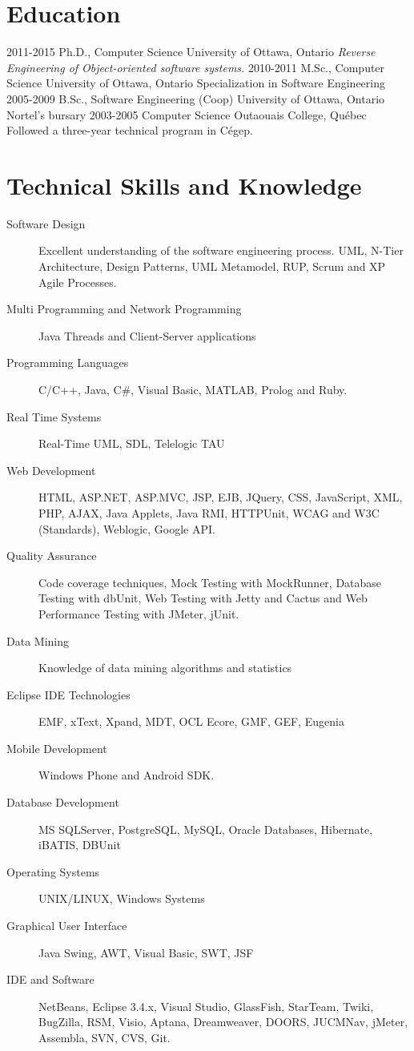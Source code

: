 \documentclass[]{friggeri-cv}
\begin{document}
\section{Education}

\begin{entrylist}
  \entry
    {2011-2015}
    {Ph.D., {\normalfont Computer Science}}
    {University of Ottawa, Ontario}
    {\emph{Reverse Engineering of Object-oriented software systems. }}
  \entry
    {2010-2011}
    {M.Sc., {\normalfont Computer Science}}
    {University of Ottawa, Ontario}
    {Specialization in Software Engineering}
  \entry
    {2005-2009}
    {B.Sc., {\normalfont Software Engineering (Coop)}}
    {University of Ottawa, Ontario}
    {Nortel's bursary}
  \entry
    {2003-2005}
    {Computer Science}
    {Outaouais College, Québec}
    {Followed a three-year technical program in Cégep.}
\end{entrylist}


\section{Technical Skills and Knowledge}

\begin{description}
\item [Software Design] Excellent understanding of the software engineering process. UML, N-Tier Architecture, Design Patterns, UML Metamodel, RUP, Scrum and XP Agile Processes. 
\item [Multi Programming and Network Programming] Java Threads and Client-Server applications
\item [Programming Languages] C/C++, Java, C\#, Visual Basic, MATLAB, Prolog and Ruby.
\item [Real Time Systems] Real-Time UML, SDL, Telelogic TAU
\item [Web Development] HTML, ASP.NET, ASP.MVC, JSP, EJB, JQuery, CSS, JavaScript, XML, PHP, AJAX, Java Applets, Java RMI, HTTPUnit, WCAG and W3C (Standards), Weblogic, Google API.
\item [Quality Assurance] Code coverage techniques, Mock Testing with MockRunner, Database Testing with dbUnit, Web Testing with Jetty and Cactus and Web Performance Testing with JMeter, jUnit.
\item [Data Mining] Knowledge of data mining algorithms and statistics
\item [Eclipse IDE Technologies] EMF, xText, Xpand, MDT, OCL Ecore, GMF, GEF, Eugenia
\item [Mobile Development] Windows Phone and Android SDK.
\item [Database Development] MS SQLServer, PostgreSQL,  MySQL, Oracle Databases, Hibernate, iBATIS, DBUnit
\item [Operating Systems] UNIX/LINUX, Windows Systems
\item [Graphical User Interface] Java Swing, AWT, Visual Basic, SWT, JSF
\item [IDE and Software] NetBeans, Eclipse 3.4.x, Visual Studio, GlassFish, StarTeam, Twiki, BugZilla, RSM, Visio, Aptana, Dreamweaver, DOORS, JUCMNav, jMeter, Assembla, SVN, CVS, Git.
\end{description}
\end{document}
